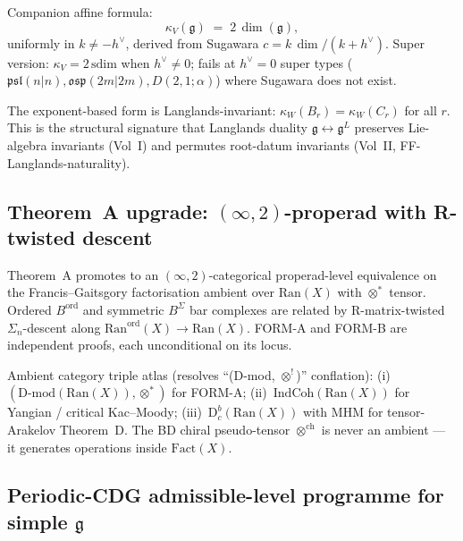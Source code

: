 \documentclass[11pt]{article}
\begin{document}
Companion affine formula:
\begin{equation}
  \kappa_V(\mathfrak{g})\;=\;2\,\dim(\mathfrak{g}),
\end{equation}
uniformly in $k \ne -h^{\vee}$, derived from Sugawara
$c = k\,\dim / (k+h^{\vee})$. Super version: $\kappa_V = 2\,\mathrm{sdim}$
when $h^{\vee} \ne 0$; fails at $h^{\vee} = 0$ super types
($\mathfrak{psl}(n|n), \mathfrak{osp}(2m|2m), D(2,1;\alpha)$) where
Sugawara does not exist.

The exponent-based form is Langlands-invariant:
$\kappa_W(B_r) = \kappa_W(C_r)$ for all $r$. This is the structural
signature that Langlands duality $\mathfrak{g} \leftrightarrow
\mathfrak{g}^L$ preserves Lie-algebra invariants (Vol~I) and
permutes root-datum invariants (Vol~II, FF-Langlands-naturality).

\subsection{Theorem~A upgrade: $(\infty,2)$-properad with R-twisted descent}

Theorem~A promotes to an $(\infty,2)$-categorical properad-level
equivalence on the Francis--Gaitsgory factorisation ambient over
$\mathrm{Ran}(X)$ with $\otimes^*$ tensor. Ordered
$B^{\mathrm{ord}}$ and symmetric $B^{\Sigma}$ bar complexes are
related by R-matrix-twisted $\Sigma_n$-descent along
$\mathrm{Ran}^{\mathrm{ord}}(X) \to \mathrm{Ran}(X)$. FORM-A and
FORM-B are independent proofs, each unconditional on its locus.

Ambient category triple atlas (resolves ``(D-mod, $\otimes^!$)''
conflation): (i)~$(\mathrm{D\text{-}mod}(\mathrm{Ran}(X)), \otimes^*)$
for FORM-A; (ii)~$\mathrm{IndCoh}(\mathrm{Ran}(X))$ for
Yangian / critical Kac--Moody; (iii)~$\mathrm{D}^b_c(\mathrm{Ran}(X))$
with MHM for tensor-Arakelov Theorem~D. The BD chiral pseudo-tensor
$\otimes^{\mathrm{ch}}$ is never an ambient --- it generates
operations inside $\mathrm{Fact}(X)$.

\subsection{Periodic-CDG admissible-level programme for simple $\mathfrak{g}$}
\end{document}
